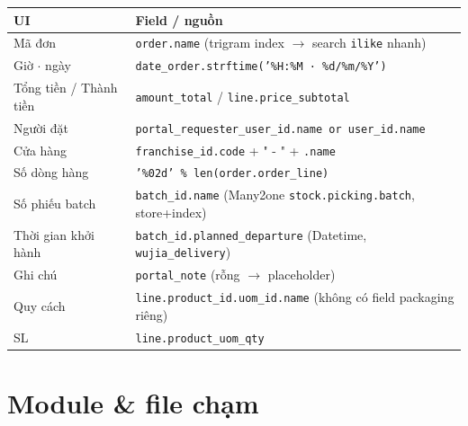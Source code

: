 \begin{longtable}{@{}lp{8.6cm}@{}}
\toprule
\textbf{UI} & \textbf{Field / nguồn} \\
\midrule
\endhead
Mã đơn & \texttt{order.name} (trigram index \(\rightarrow\) search \texttt{ilike} nhanh) \\
Giờ \(\cdot\) ngày & \texttt{date\_order.strftime('\%H:\%M · \%d/\%m/\%Y')} \\
Tổng tiền / Thành tiền & \texttt{amount\_total} / \texttt{line.price\_subtotal} \\
Người đặt & \texttt{portal\_requester\_user\_id.name or user\_id.name} \\
Cửa hàng & \texttt{franchise\_id.code} + " - " + \texttt{.name} \\
Số dòng hàng & \texttt{'\%02d' \% len(order.order\_line)} \\
Số phiếu batch & \texttt{batch\_id.name} (Many2one \texttt{stock.picking.batch}, store+index) \\
Thời gian khởi hành & \texttt{batch\_id.planned\_departure} (Datetime, \texttt{wujia\_delivery}) \\
Ghi chú & \texttt{portal\_note} (rỗng \(\rightarrow\) placeholder) \\
Quy cách & \texttt{line.product\_id.uom\_id.name} (không có field packaging riêng) \\
SL & \texttt{line.product\_uom\_qty} \\
\bottomrule
\end{longtable}

\section{Module \& file chạm}

